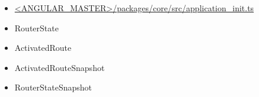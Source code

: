 















\begin{itemize}
  \item \href{https://github.com/angular/angular/blob/master/packages/core/src/application_init.ts}
        {<ANGULAR\_MASTER>/packages/core/src/application\_init.ts}
\end{itemize}











\begin{itemize}
  \item RouterState
  \item ActivatedRoute
  \item ActivatedRouteSnapshot
  \item RouterStateSnapshot
\end{itemize}

